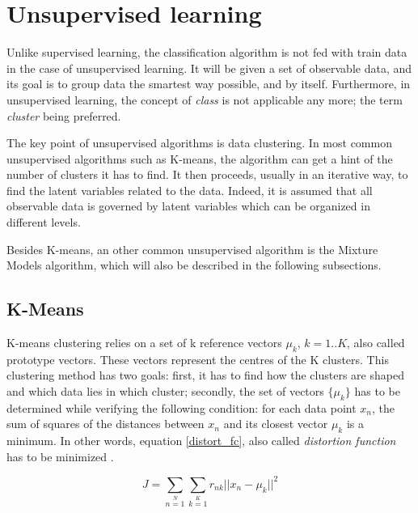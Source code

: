 \section{Unsupervised learning}

\vspace{\baselineskip}
\noindent Unlike supervised learning, the classification algorithm is not fed with train data in the case of unsupervised learning. It will be given a set of observable data, and its goal is to group data the smartest way possible, and by itself. Furthermore, in unsupervised learning, the concept of \textit{class} is not applicable any more; the term \textit{cluster} being preferred.
\newline

\noindent The key point of unsupervised algorithms is data clustering. In most common unsupervised algorithms such as K-means, the algorithm can get a hint of the number of clusters it has to find. It then proceeds, usually in an iterative way, to find the latent variables related to the data. Indeed, it is assumed that all observable data is governed by latent variables which can be organized in different levels.
\newline

\noindent Besides K-means, an other common unsupervised algorithm is the Mixture Models algorithm, which will also be described in the following subsections.
\newline

\subsection{K-Means}

\vspace{\baselineskip}
\noindent K-means clustering relies on a set of k reference vectors $\mu_k$, $k=1..K$, also called prototype vectors. These vectors represent the centres of the K clusters. This clustering method has two goals: first, it has to find how the clusters are shaped and which data lies in which cluster; secondly, the set of vectors $\{\mu_k\}$ has to be determined while verifying the following condition: for each data point $x_n$, the sum of squares of the distances between $x_n$ and its closest vector $\mu_k$ is a minimum. In other words, equation \ref{distort_fc}, also called \textit{distortion function} has to be minimized \cite{BIS06}.

\begin{equation}
J = \sum\limits_{n=1}\limits^{N} \sum\limits_{k=1}\limits^{K} r_{nk} ||x_n - \mu_k||^2
\label{distort_fc}
\end{equation}

